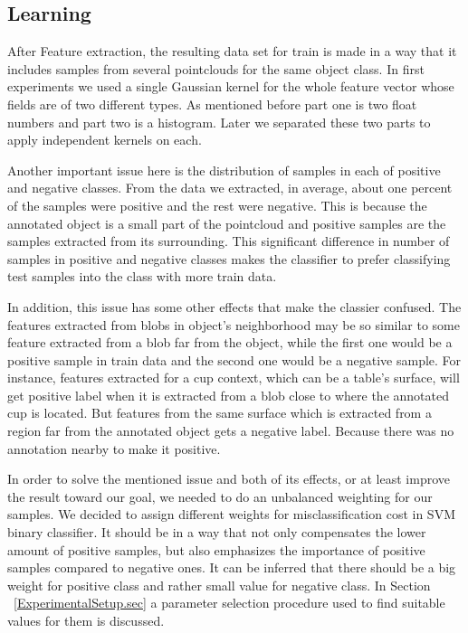 \subsection{Learning}
\label{Learning.ssec}


After Feature extraction, the resulting data set for train is made in a way that it includes samples from several pointclouds 
for the same object class. 
In first experiments we used a single Gaussian kernel for the whole feature vector whose fields are of two different types. 
As mentioned before part one is two float numbers and part two is a histogram. 
Later we separated these two parts to apply independent kernels on each. 

Another important issue here is the distribution of samples in each of positive and negative classes. 
From the data we extracted, in average, about one percent of the samples were positive and the rest were negative.
This is because the annotated object is a small part of the pointcloud and positive samples are the samples extracted from its 
surrounding. 
This significant difference in number of samples in positive and negative classes makes the classifier to prefer classifying test samples into 
the class with more train data.

In addition, this issue has some other effects that make the classier confused. 
The features extracted from blobs in object's neighborhood may be so similar to some feature extracted from a blob far from the 
object, while the first one would be a positive sample in train data and the second one would be a negative sample. 
For instance, features extracted for a cup context, which can be a table's surface, will get positive label when it is extracted 
from a blob close to where the annotated cup is located. 
But features from the same surface which is extracted from a region far from the annotated object gets a negative label.
Because there was no annotation nearby to make it positive. 

In order to solve the mentioned issue and both of its effects, or at least improve the result toward our goal, we needed to do 
an unbalanced weighting for our samples. 
We decided to assign different weights for misclassification cost in SVM binary classifier. 
It should be in a way that not only compensates the lower amount of positive samples, but also emphasizes the importance of 
positive samples compared to negative ones. 
It can be inferred that there should be a big weight for positive class and rather small value for negative class.
In Section ~\ref{ExperimentalSetup.sec} a parameter selection procedure used to find suitable values for them is discussed.      

